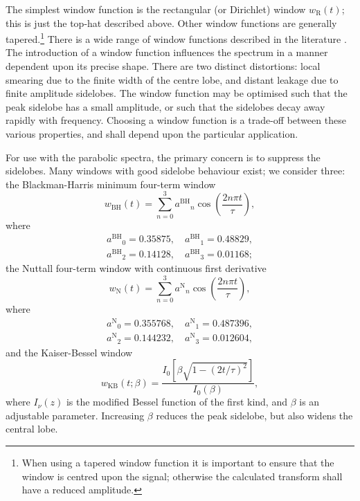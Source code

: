 \documentclass[useAMS,usedcolumn,usegraphicx,usenatbib]{mn2e}
\newcommand{\sub}[1]{\ensuremath{_\mathrm{#1}}}
\newcommand{\super}[1]{\ensuremath{^\mathrm{#1}}}
\begin{document}
The simplest window function is the rectangular (or Dirichlet) window $w\sub{R}(t)$; this is just the top-hat described above. Other window functions are generally tapered.\footnote{When using a tapered window function it is important to ensure that the window is centred upon the signal; otherwise the calculated transform shall have a reduced amplitude.} There is a wide range of window functions described in the literature \citep*{Harris1978,Kaiser1980,Nuttall1981,McKechan2010}. The introduction of a window function influences the spectrum in a manner dependent upon its precise shape. There are two distinct distortions: local smearing due to the finite width of the centre lobe, and distant leakage due to finite amplitude sidelobes. The window function may be optimised such that the peak sidelobe has a small amplitude, or such that the sidelobes decay away rapidly with frequency. Choosing a window function is a trade-off between these various properties, and shall depend upon the particular application.

For use with the parabolic spectra, the primary concern is to suppress the sidelobes. Many windows with good sidelobe behaviour exist; we consider three: the Blackman-Harris minimum four-term window \citep{Harris1978, Nuttall1981}
\begin{equation}
w\sub{BH}(t) = \sum_{n=0}^{3} a\super{BH}_n\cos\left(\frac{2n\pi t}{\tau}\right),
\end{equation}
where
\begin{equation}
\begin{split}
a\super{BH}_0 = 0.35875, \quad a\super{BH}_1 = 0.48829,\\
a\super{BH}_2 = 0.14128, \quad a\super{BH}_3 = 0.01168;
\end{split}
\end{equation}
the Nuttall four-term window with continuous first derivative \citep{Nuttall1981}
\begin{equation}
w\sub{N}(t) = \sum_{n=0}^{3} a\super{N}_n\cos\left(\frac{2n\pi t}{\tau}\right),
\end{equation}
where
\begin{equation}
\begin{split}
a\super{N}_0 = 0.355768, \quad a\super{N}_1 = 0.487396,\\
a\super{N}_2 = 0.144232, \quad a\super{N}_3 = 0.012604,
\end{split}
\end{equation}
and the Kaiser-Bessel window \citep{Harris1978, Kaiser1980}
\begin{equation}
w\sub{KB}(t;\beta) = \frac{I_0\left[\beta\sqrt{1 - (2 t/\tau)^2}\right]}{I_0(\beta)},
\end{equation}
where $I_\nu(z)$ is the modified Bessel function of the first kind, and $\beta$ is an adjustable parameter. Increasing $\beta$ reduces the peak sidelobe, but also widens the central lobe.
\end{document}
